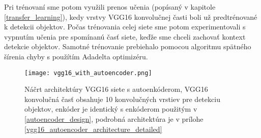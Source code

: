 Pri trénovaní sme potom využili prenos učenia (popísaný v kapitole \ref{transfer_learning}), kedy vrstvy VGG16 konvolučnej časti boli už predtrénované k detekcii objektov. Počas trénovania celej siete sme potom experimentovali s vypnutím učenia pre spomínanú časť siete, keďže sme chceli zachovať kontext detekcie objektov. Samotné trénovanie prebiehalo pomocou algoritmu spätného šírenia chyby s použítím Adadelta optimizéru. 


\begin{figure}[H]
	\begin{center}
		\texttt{[image: vgg16\_with\_autoencoder.png]}
		\caption[Náčrt architektúry VGG16 siete s autoenkóderom]{
			Náčrt architektúry VGG16 siete s autoenkóderom, VGG16 konvolučná časť obsahuje 10 konvolučných vrstiev pre detekciu objektov, enkóder je identický s enkóderom použitým v \ref{autoencoder_design}, podrobná architektúra je v prílohe \ref{vgg16_autoencoder_architecture_detailed}
		}\label{vgg_16_with_autoencoder}
	\end{center}
\end{figure}


